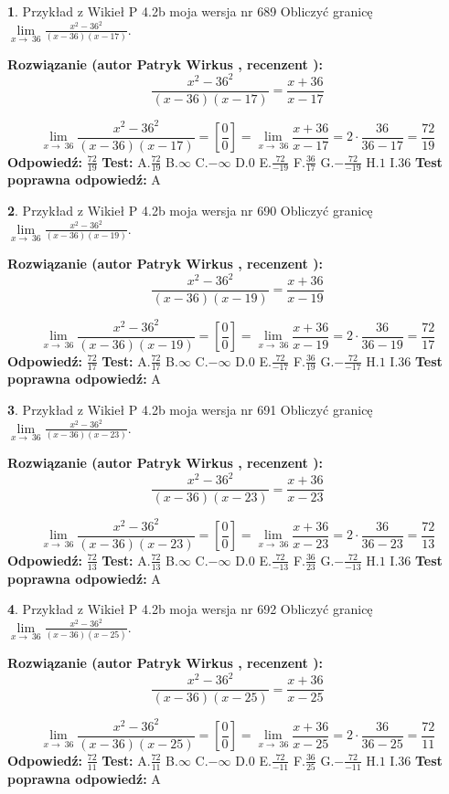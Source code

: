 \documentclass[12pt, a4paper]{article}
\theoremstyle{definition} %
\newtheorem{zad}{}
\newcommand{\zadStart}[1]{\begin{zad}#1\newline}
\newcommand{\zadStop}{\end{zad}}
\newcommand{\rozwStart}[2]{\noindent \textbf{Rozwiązanie (autor #1 , recenzent #2): }\newline}
\newcommand{\rozwStop}{\newline}
\newcommand{\odpStart}{\noindent \textbf{Odpowiedź:}\newline}
\newcommand{\odpStop}{\newline}
\newcommand{\testStart}{\noindent \textbf{Test:}\newline}
\newcommand{\testStop}{\newline}
\newcommand{\kluczStart}{\noindent \textbf{Test poprawna odpowiedź:}\newline}
\newcommand{\kluczStop}{\newline}
\begin{document}
\zadStart{Przykład z Wikieł P 4.2b moja wersja nr 689}
Obliczyć granicę $\lim\limits_{x\to\ 36}\frac{x^{2}-36^{2}}{(x-36)(x-17)}$.
\zadStop
\rozwStart{Patryk Wirkus}{}
$$\frac{x^{2}-36^{2}}{(x-36)(x-17)}=\frac{x+36}{x-17}$$

$$\lim\limits_{x\to\ 36}\frac{x^{2}-36^{2}}{(x-36)(x-17)}=[\frac{0}{0}]=\lim\limits_{x\to\ 36}\frac{x+36}{x-17}=2 \cdot \frac{36}{36-17} = \frac{72}{19}$$
\rozwStop
\odpStart
$\frac{72}{19}$
\odpStop
\testStart
A.$\frac{72}{19}$
B.$\infty$
C.$-\infty$
D.$0$
E.$\frac{72}{-19}$
F.$\frac{36}{17}$
G.$-\frac{72}{-19}$
H.$1$
I.$36$
\testStop
\kluczStart
A
\kluczStop



\zadStart{Przykład z Wikieł P 4.2b moja wersja nr 690}
Obliczyć granicę $\lim\limits_{x\to\ 36}\frac{x^{2}-36^{2}}{(x-36)(x-19)}$.
\zadStop
\rozwStart{Patryk Wirkus}{}
$$\frac{x^{2}-36^{2}}{(x-36)(x-19)}=\frac{x+36}{x-19}$$

$$\lim\limits_{x\to\ 36}\frac{x^{2}-36^{2}}{(x-36)(x-19)}=[\frac{0}{0}]=\lim\limits_{x\to\ 36}\frac{x+36}{x-19}=2 \cdot \frac{36}{36-19} = \frac{72}{17}$$
\rozwStop
\odpStart
$\frac{72}{17}$
\odpStop
\testStart
A.$\frac{72}{17}$
B.$\infty$
C.$-\infty$
D.$0$
E.$\frac{72}{-17}$
F.$\frac{36}{19}$
G.$-\frac{72}{-17}$
H.$1$
I.$36$
\testStop
\kluczStart
A
\kluczStop



\zadStart{Przykład z Wikieł P 4.2b moja wersja nr 691}
Obliczyć granicę $\lim\limits_{x\to\ 36}\frac{x^{2}-36^{2}}{(x-36)(x-23)}$.
\zadStop
\rozwStart{Patryk Wirkus}{}
$$\frac{x^{2}-36^{2}}{(x-36)(x-23)}=\frac{x+36}{x-23}$$

$$\lim\limits_{x\to\ 36}\frac{x^{2}-36^{2}}{(x-36)(x-23)}=[\frac{0}{0}]=\lim\limits_{x\to\ 36}\frac{x+36}{x-23}=2 \cdot \frac{36}{36-23} = \frac{72}{13}$$
\rozwStop
\odpStart
$\frac{72}{13}$
\odpStop
\testStart
A.$\frac{72}{13}$
B.$\infty$
C.$-\infty$
D.$0$
E.$\frac{72}{-13}$
F.$\frac{36}{23}$
G.$-\frac{72}{-13}$
H.$1$
I.$36$
\testStop
\kluczStart
A
\kluczStop



\zadStart{Przykład z Wikieł P 4.2b moja wersja nr 692}
Obliczyć granicę $\lim\limits_{x\to\ 36}\frac{x^{2}-36^{2}}{(x-36)(x-25)}$.
\zadStop
\rozwStart{Patryk Wirkus}{}
$$\frac{x^{2}-36^{2}}{(x-36)(x-25)}=\frac{x+36}{x-25}$$

$$\lim\limits_{x\to\ 36}\frac{x^{2}-36^{2}}{(x-36)(x-25)}=[\frac{0}{0}]=\lim\limits_{x\to\ 36}\frac{x+36}{x-25}=2 \cdot \frac{36}{36-25} = \frac{72}{11}$$
\rozwStop
\odpStart
$\frac{72}{11}$
\odpStop
\testStart
A.$\frac{72}{11}$
B.$\infty$
C.$-\infty$
D.$0$
E.$\frac{72}{-11}$
F.$\frac{36}{25}$
G.$-\frac{72}{-11}$
H.$1$
I.$36$
\testStop
\kluczStart
A
\kluczStop
\end{document}
